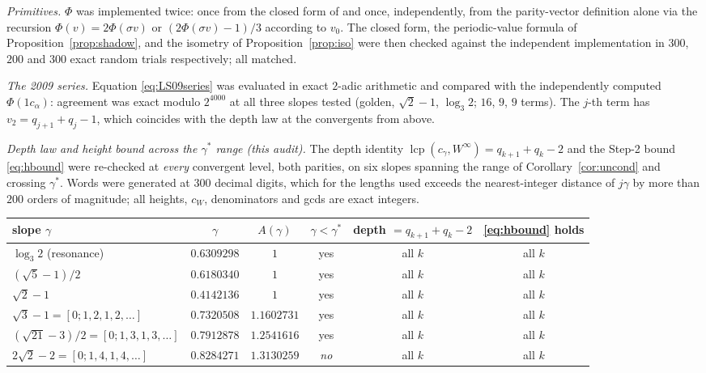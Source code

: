 \documentclass[11pt,reqno]{amsart}
\theoremstyle{plain}
\theoremstyle{definition}
\DeclareMathOperator{\lcp}{lcp}
\newcommand{\PH}{\Phi}
\newcommand{\gs}{\gamma^{*}}
\newcommand{\Av}{A(\gamma)}
\newcommand{\vtwo}{v_2}
\begin{document}
\emph{Primitives.} $\PH$ was implemented twice: once from the closed form of
\cite[Proposition 2.1]{DJirr} and once, independently, from the parity-vector definition alone via
the recursion $\PH(v)=2\PH(\sigma v)$ or $(2\PH(\sigma v)-1)/3$ according to $v_0$. The closed
form, the periodic-value formula of Proposition~\ref{prop:shadow}, and the isometry of
Proposition~\ref{prop:iso} were then checked against the independent implementation in $300$, $200$
and $300$ exact random trials respectively; all matched.

\emph{The 2009 series.} Equation \eqref{eq:LS09series} was evaluated in exact $2$-adic arithmetic
and compared with the independently computed $\PH(1c_\alpha)$: agreement was exact modulo $2^{4000}$
at all three slopes tested (golden, $\sqrt2-1$, $\log_3 2$; $16$, $9$, $9$ terms). The $j$-th term
has $\vtwo=q_{j+1}+q_j-1$, which coincides with the depth law at the convergents from above.

\emph{Depth law and height bound across the $\gs$ range (this audit).} The depth identity
$\lcp(c_\gamma,W^{\infty})=q_{k+1}+q_k-2$ and the Step-2 bound \eqref{eq:hbound} were re-checked at
\emph{every} convergent level, both parities, on six slopes spanning the range of
Corollary~\ref{cor:uncond} and crossing $\gs$. Words were generated at $300$ decimal digits, which
for the lengths used exceeds the nearest-integer distance of $j\gamma$ by more than $200$ orders of
magnitude; all heights, $c_W$, denominators and gcds are exact integers.

\begin{center}\footnotesize
\begin{tabular}{@{}lccccc@{}}
\toprule
slope $\gamma$ & $\gamma$ & $\Av$ & $\gamma<\gs$ & depth $=q_{k+1}+q_k-2$ & \eqref{eq:hbound} holds\\
\midrule
$\log_3 2$ (resonance)      & $0.6309298$ & $1$         & yes & all $k$ & all $k$\\
$(\sqrt5-1)/2$              & $0.6180340$ & $1$         & yes & all $k$ & all $k$\\
$\sqrt2-1$                  & $0.4142136$ & $1$         & yes & all $k$ & all $k$\\
$\sqrt3-1=[0;1,2,1,2,\dots]$& $0.7320508$ & $1.1602731$ & yes & all $k$ & all $k$\\
$(\sqrt{21}-3)/2=[0;1,3,1,3,\dots]$ & $0.7912878$ & $1.2541616$ & yes & all $k$ & all $k$\\
$2\sqrt2-2=[0;1,4,1,4,\dots]$       & $0.8284271$ & $1.3130259$ & \emph{no} & all $k$ & all $k$\\
\bottomrule
\end{tabular}
\end{center}
\end{document}

